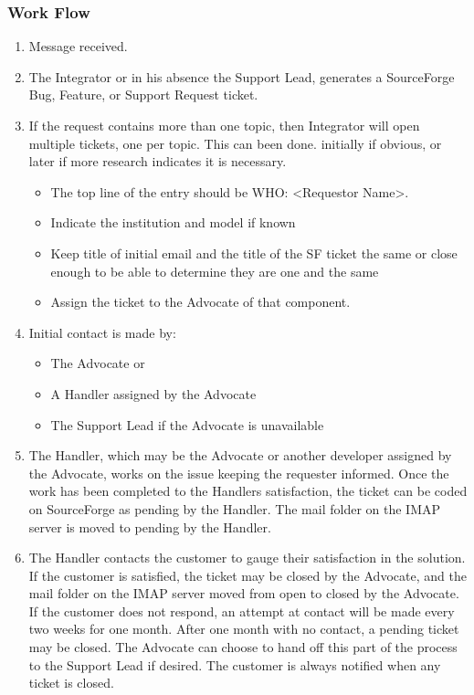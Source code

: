 \subsubsection{Work Flow}
\begin{enumerate}
\item Message received.
\item The Integrator or in his absence the Support Lead, generates a SourceForge Bug, Feature, or Support Request ticket.
\item If the request contains more than one topic, then Integrator will open multiple tickets, one per topic. This can been done.
initially if obvious, or later if more research indicates it is necessary. 

\begin{itemize}
\item The top line of the entry should be WHO: <Requestor Name>.
\item Indicate the institution and model if known
\item Keep title of initial email and the title of the SF ticket the
same or close enough to be able to determine they are one and the same
\item Assign the ticket to the Advocate of that component. 
\end{itemize}

\item Initial contact is made by:

\begin{itemize}
\item The Advocate or
\item A Handler assigned by the Advocate
\item The Support Lead if the Advocate is unavailable
\end{itemize}

\item The Handler, which may be the Advocate or another developer assigned by the 
Advocate, works on the issue keeping the requester informed. Once the work has been 
completed to the Handlers satisfaction, the ticket can be coded on SourceForge as 
pending by the Handler.  The mail folder on the IMAP server is moved to pending by 
the Handler.

\item The Handler contacts the customer to gauge their satisfaction in the solution. 
If the customer is satisfied, the ticket may be closed by the Advocate, and the mail 
folder on the IMAP server moved from open to closed by the Advocate.  If the customer
does not respond, an attempt at contact will be made every two weeks for one month. 
After one month with no contact, a pending ticket may be closed.  The Advocate can 
choose to hand off this part of the process to the Support Lead if desired.  The 
customer is always notified when any ticket is closed. 
\end{enumerate}

